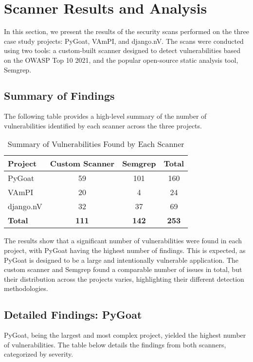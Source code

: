 
\section{Scanner Results and Analysis}
In this section, we present the results of the security scans performed on the three case study projects: PyGoat, VAmPI, and django.nV. The scans were conducted using two tools: a custom-built scanner designed to detect vulnerabilities based on the OWASP Top 10 2021, and the popular open-source static analysis tool, Semgrep.

\subsection{Summary of Findings}

The following table provides a high-level summary of the number of vulnerabilities identified by each scanner across the three projects.

\begin{table}[h!]
\centering
\caption{Summary of Vulnerabilities Found by Each Scanner}
\label{tab:summary_findings}
\begin{tabular}{|l|c|c|c|}
\hline
\textbf{Project} & \textbf{Custom Scanner} & \textbf{Semgrep} & \textbf{Total} \\
\hline
PyGoat & 59 & 101 & 160 \\
\hline
VAmPI & 20 & 4 & 24 \\
\hline
django.nV & 32 & 37 & 69 \\
\hline
\textbf{Total} & \textbf{111} & \textbf{142} & \textbf{253} \\
\hline
\end{tabular}
\end{table}

The results show that a significant number of vulnerabilities were found in each project, with PyGoat having the highest number of findings. This is expected, as PyGoat is designed to be a large and intentionally vulnerable application. The custom scanner and Semgrep found a comparable number of issues in total, but their distribution across the projects varies, highlighting their different detection methodologies.

\subsection{Detailed Findings: PyGoat}

PyGoat, being the largest and most complex project, yielded the highest number of vulnerabilities. The table below details the findings from both scanners, categorized by severity.

